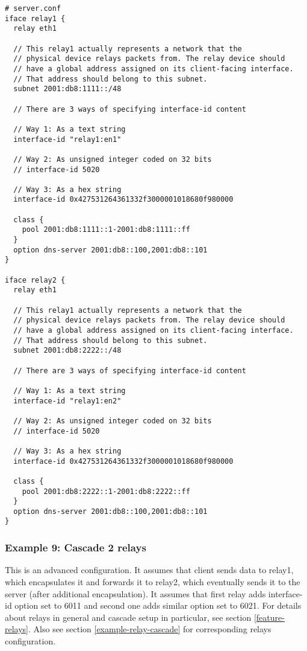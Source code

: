 \begin{lstlisting}
# server.conf
iface relay1 {
  relay eth1

  // This relay1 actually represents a network that the
  // physical device relays packets from. The relay device should
  // have a global address assigned on its client-facing interface.
  // That address should belong to this subnet.
  subnet 2001:db8:1111::/48

  // There are 3 ways of specifying interface-id content

  // Way 1: As a text string
  interface-id "relay1:en1"

  // Way 2: As unsigned integer coded on 32 bits
  // interface-id 5020

  // Way 3: As a hex string
  interface-id 0x427531264361332f3000001018680f980000

  class {
    pool 2001:db8:1111::1-2001:db8:1111::ff
  }
  option dns-server 2001:db8::100,2001:db8::101
}

iface relay2 {
  relay eth1

  // This relay1 actually represents a network that the
  // physical device relays packets from. The relay device should
  // have a global address assigned on its client-facing interface.
  // That address should belong to this subnet.
  subnet 2001:db8:2222::/48

  // There are 3 ways of specifying interface-id content

  // Way 1: As a text string
  interface-id "relay1:en2"

  // Way 2: As unsigned integer coded on 32 bits
  // interface-id 5020

  // Way 3: As a hex string
  interface-id 0x427531264361332f3000001018680f980000

  class {
    pool 2001:db8:2222::1-2001:db8:2222::ff
  }
  option dns-server 2001:db8::100,2001:db8::101
}

\end{lstlisting}

\subsubsection{Example 9: Cascade 2 relays}
\label{example-server-relay2}
This is an advanced configuration. It assumes that client sends data to
relay1, which encapsulates it and forwards it to relay2, which
eventually sends it to the server (after additional encapsulation). It
assumes that first relay adds interface-id option set to 6011 and
second one adds similar option set to 6021. For details about relays
in general and cascade setup in particular, see section
\ref{feature-relays}. Also see section \ref{example-relay-cascade}
for corresponding relays configuration.

